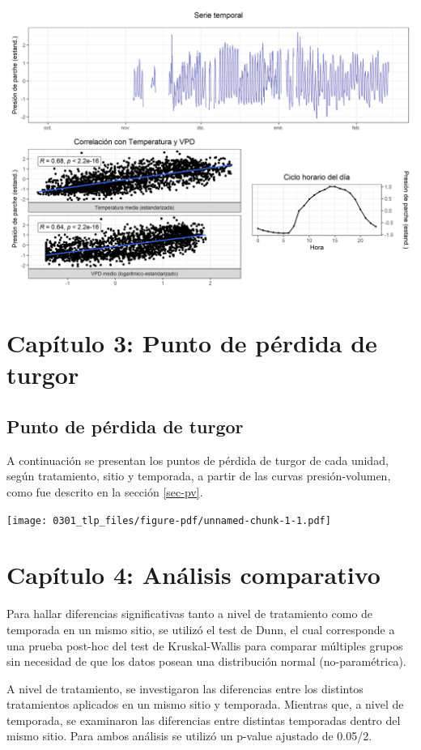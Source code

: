 \documentclass[
  letterpaper,
  DIV=11,
  numbers=noendperiod]{scrreprt}
\begin{document}
\includegraphics{figuras/05_turgor_tratamiento/2023_2024_Rio_Claro_T4.png}

\part{Capítulo 3: Punto de pérdida de turgor}

\chapter{Punto de pérdida de
turgor}\label{punto-de-puxe9rdida-de-turgor}

A continuación se presentan los puntos de pérdida de turgor de cada
unidad, según tratamiento, sitio y temporada, a partir de las curvas
presión-volumen, como fue descrito en la sección \ref{sec-pv}.

\begin{center}
\texttt{[image: 0301\_tlp\_files/figure-pdf/unnamed-chunk-1-1.pdf]}
\end{center}

\part{Capítulo 4: Análisis comparativo}

Para hallar diferencias significativas tanto a nivel de tratamiento como
de temporada en un mismo sitio, se utilizó el test de Dunn, el cual
corresponde a una prueba post-hoc del test de Kruskal-Wallis para
comparar múltiples grupos sin necesidad de que los datos posean una
distribución normal (no-paramétrica).

A nivel de tratamiento, se investigaron las diferencias entre los
distintos tratamientos aplicados en un mismo sitio y temporada. Mientras
que, a nivel de temporada, se examinaron las diferencias entre distintas
temporadas dentro del mismo sitio. Para ambos análisis se utilizó un
p-value ajustado de 0.05/2.
\end{document}
